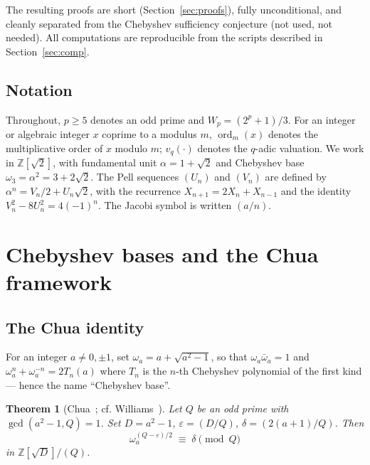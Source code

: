 \documentclass[11pt,a4paper]{amsart}
\theoremstyle{plain}
\newtheorem{theorem}{Theorem}[section]
\theoremstyle{definition}
\DeclareMathOperator{\ord}{ord}
\newcommand{\Z}{\mathbb{Z}}
\newcommand{\wom}{\omega_3}
\newcommand{\sqrttwo}{\sqrt{2}}
\begin{document}
The resulting proofs are short (Section~\ref{sec:proofs}), fully
unconditional, and cleanly separated from the Chebyshev sufficiency
conjecture (not used, not needed). All computations are reproducible
from the scripts described in Section~\ref{sec:comp}.

\subsection{Notation}

Throughout, $p \geq 5$ denotes an odd prime and $W_p = (2^p + 1)/3$.
For an integer or algebraic integer $x$ coprime to a modulus $m$,
$\ord_m(x)$ denotes the multiplicative order of $x$ modulo $m$;
$v_q(\cdot)$ denotes the $q$-adic valuation. We work in
$\Z[\sqrttwo]$, with fundamental unit $\alpha = 1 + \sqrttwo$ and
Chebyshev base $\wom = \alpha^2 = 3 + 2\sqrttwo$. The Pell sequences
$(U_n)$ and $(V_n)$ are defined by $\alpha^n = V_n/2 + U_n \sqrttwo$,
with the recurrence $X_{n+1} = 2 X_n + X_{n-1}$ and the identity
$V_n^2 - 8 U_n^2 = 4(-1)^n$. The Jacobi symbol is written $(a/n)$.

\section{Chebyshev bases and the Chua framework}

\subsection{The Chua identity}

For an integer $a \neq 0, \pm 1$, set $\omega_a = a + \sqrt{a^2 - 1}$,
so that $\omega_a \bar\omega_a = 1$ and $\omega_a^n + \omega_a^{-n} =
2 T_n(a)$ where $T_n$ is the $n$-th Chebyshev polynomial of the first
kind --- hence the name ``Chebyshev base''.

\begin{theorem}[Chua~\cite{Chua}; cf. Williams~{\cite[Ch.~4]{Williams}}]
\label{thm:chua}
Let $Q$ be an odd prime with $\gcd(a^2 - 1, Q) = 1$. Set
$D = a^2 - 1$, $\varepsilon = (D/Q)$, $\delta = (2(a+1)/Q)$. Then
\[
  \omega_a^{(Q - \varepsilon)/2} \;\equiv\; \delta \pmod{Q}
\]
in $\Z[\sqrt{D}]/(Q)$.
\end{theorem}
\end{document}
